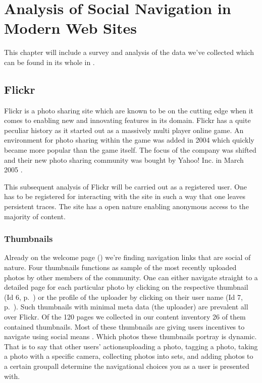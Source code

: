 \chapter{Analysis of Social Navigation in Modern Web Sites}
\label{chapter:analysis}

This chapter will include a survey and analysis of the data we've collected
which can be found in its whole in
.

\section{Flickr}
\label{section:analysis.flickr}


Flickr is a photo sharing site which are known to be on the cutting edge when
it comes to enabling new and innovating features in its domain. Flickr has a
quite peculiar history as it started out as a massively multi player online
game. An environment for photo sharing within the game was added in 2004 which
quickly became more popular than the game itself. The focus of the company was
shifted and their new photo sharing community was bought by Yahoo! Inc. in
March 2005 \citep[]{livingston07}.

This subsequent
analysis of Flickr will be carried out as a registered user. One has to be
registered for interacting with the site in such a way that one leaves
persistent traces. The site has a open nature enabling anonymous access
to the majority of content.

\subsection{Thumbnails}

Already on the welcome page ()
we're finding navigation links that are social of
nature. Four thumbnails functions as sample of the most recently uploaded
photos by other members of the community. One can either navigate straight to
a detailed page for each particular photo by clicking on the respective
thumbnail (Id 6, p.~\pageref{table:flickr.content.inventory.6})
or the profile of the uploader by clicking on their user
name (Id 7, p.~\pageref{table:flickr.content.inventory.7}). Such thumbnails
with minimal meta data (the uploader) are prevalent all over Flickr. Of the
120 pages we collected in our content inventory 26 of them contained
thumbnails. Most of these thumbnails
are giving users incentives to navigate using social means%
.
Which photos these thumbnails portray is dynamic. That is to say that other
users' actions\dash{}uploading a photo, tagging a photo, taking a photo with a
specific camera, collecting photos into sets, and adding photos to a certain
group\dash{}all determine the navigational choices you as a user is
presented with.

